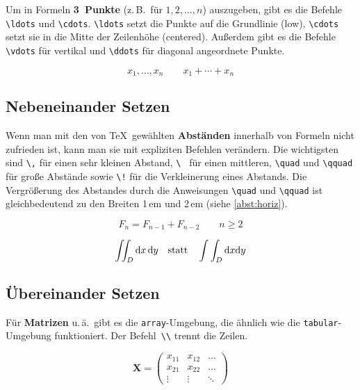 Um in Formeln \textbf{3~Punkte} (z.\,B.\ für \(1,2,\ldots,n\))
auszugeben, gibt es die Befehle
\lstinline|\ldots| und \lstinline|\cdots|.
\lstinline|\ldots| setzt die Punkte auf die Grundlinie (low),
\lstinline|\cdots| setzt sie in die Mitte der Zeilenhöhe
(centered).
Außerdem gibt es die Befehle
\lstinline|\vdots| für vertikal und
\lstinline|\ddots| für diagonal angeordnete Punkte.

\begin{LTXexample}
\[
x_{1},\ldots,x_{n} \qquad
x_{1}+\cdots+x_{n}
\]
\end{LTXexample}


\subsection{Nebeneinander Setzen}
 
Wenn man mit den von \TeX\ gewählten \textbf{Abständen}
innerhalb von Formeln nicht zufrieden ist, kann man sie mit
expliziten Befehlen verändern. Die wichtigsten sind
\lstinline|\,| für einen sehr kleinen Abstand,
\lstinline|\ | für einen mittleren,
\lstinline|\quad| und \lstinline|\qquad| für große Abstände sowie
\lstinline|\!| für die Verkleinerung eines Abstands. Die Vergrößerung des Abstandes
durch die Anweisungen \lstinline|\quad| und \lstinline|\qquad| ist gleichbedeutend zu den Breiten 1\,em und 2\,em (siehe \vref{abst:horiz}).

\begin{LTXexample}
\[
F_{n} = F_{n-1} + F_{n-2}
 \qquad n \ge 2
\]
\end{LTXexample}


\begin{LTXexample}
\[
\int\!\!\!\int_{D} 
\mathrm{d}x\,\mathrm{d}y
\quad \textnormal{statt} \quad
\int\int_{D} 
\mathrm{d}x \mathrm{d}y
\]
\end{LTXexample}



\subsection{Übereinander Setzen}

Für \textbf{Matrizen} u.\,ä.\ gibt es die
\texttt{array}-Umgebung, die ähnlich wie die
\texttt{tabular}-Umgebung funktioniert.
Der Befehl~\lstinline|\\| trennt die Zeilen.

\begin{LTXexample}
\[
\mathbf{X} =
\left( \begin{array}{ccc}
x_{11} & x_{12} & \ldots \\
x_{21} & x_{22} & \ldots \\
\vdots & \vdots & \ddots
\end{array} \right)
\]
\end{LTXexample}


